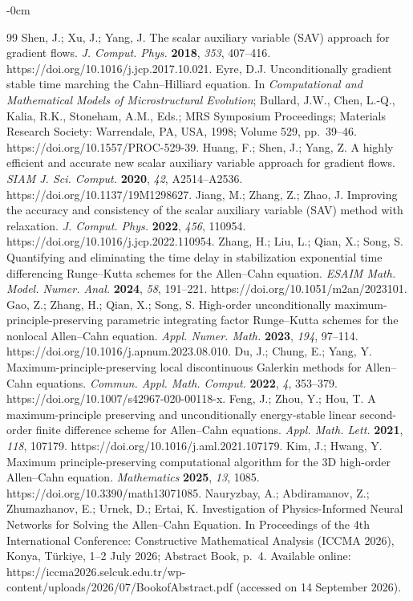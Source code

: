 \begin{adjustwidth}{-\extralength}{0cm}
\begin{thebibliography}{99}
 Shen, J.; Xu, J.; Yang, J. The scalar auxiliary variable (SAV) approach for gradient flows. \textit{J. Comput. Phys.} \textbf{2018}, \textit{353}, 407--416. https://doi.org/10.1016/j.jcp.2017.10.021.
 Eyre, D.J. Unconditionally gradient stable time marching the Cahn--Hilliard equation. In \textit{Computational and Mathematical Models of Microstructural Evolution}; Bullard, J.W., Chen, L.-Q., Kalia, R.K., Stoneham, A.M., Eds.; MRS Symposium Proceedings; Materials Research Society: Warrendale, PA, USA, 1998; Volume 529, pp.\ 39--46. https://doi.org/10.1557/PROC-529-39.
 Huang, F.; Shen, J.; Yang, Z. A highly efficient and accurate new scalar auxiliary variable approach for gradient flows. \textit{SIAM J. Sci. Comput.} \textbf{2020}, \textit{42}, A2514--A2536. https://doi.org/10.1137/19M1298627.
 Jiang, M.; Zhang, Z.; Zhao, J. Improving the accuracy and consistency of the scalar auxiliary variable (SAV) method with relaxation. \textit{J. Comput. Phys.} \textbf{2022}, \textit{456}, 110954. https://doi.org/10.1016/j.jcp.2022.110954.
 Zhang, H.; Liu, L.; Qian, X.; Song, S. Quantifying and eliminating the time delay in stabilization exponential time differencing Runge--Kutta schemes for the Allen--Cahn equation. \textit{ESAIM Math. Model. Numer. Anal.} \textbf{2024}, \textit{58}, 191--221. https://doi.org/10.1051/m2an/2023101.
 Gao, Z.; Zhang, H.; Qian, X.; Song, S. High-order unconditionally maximum-principle-preserving parametric integrating factor Runge--Kutta schemes for the nonlocal Allen--Cahn equation. \textit{Appl. Numer. Math.} \textbf{2023}, \textit{194}, 97--114. https://doi.org/10.1016/j.apnum.2023.08.010.
 Du, J.; Chung, E.; Yang, Y. Maximum-principle-preserving local discontinuous Galerkin methods for Allen--Cahn equations. \textit{Commun. Appl. Math. Comput.} \textbf{2022}, \textit{4}, 353--379. https://doi.org/10.1007/s42967-020-00118-x.
 Feng, J.; Zhou, Y.; Hou, T. A maximum-principle preserving and unconditionally energy-stable linear second-order finite difference scheme for Allen--Cahn equations. \textit{Appl. Math. Lett.} \textbf{2021}, \textit{118}, 107179. https://doi.org/10.1016/j.aml.2021.107179.
 Kim, J.; Hwang, Y. Maximum principle-preserving computational algorithm for the 3D high-order Allen--Cahn equation. \textit{Mathematics} \textbf{2025}, \textit{13}, 1085. https://doi.org/10.3390/math13071085.
 Nauryzbay, A.; Abdiramanov, Z.; Zhumazhanov, E.; Urnek, D.; Ertai, K. Investigation of Physics-Informed Neural Networks for Solving the Allen--Cahn Equation. In Proceedings of the 4th International Conference: Constructive Mathematical Analysis (ICCMA 2026), Konya, T\"urkiye, 1--2 July 2026; Abstract Book, p.~4. Available online: https://iccma2026.selcuk.edu.tr/wp-content/uploads/2026/07/BookofAbstract.pdf (accessed on 14 September 2026).

\end{thebibliography}
\end{adjustwidth}
